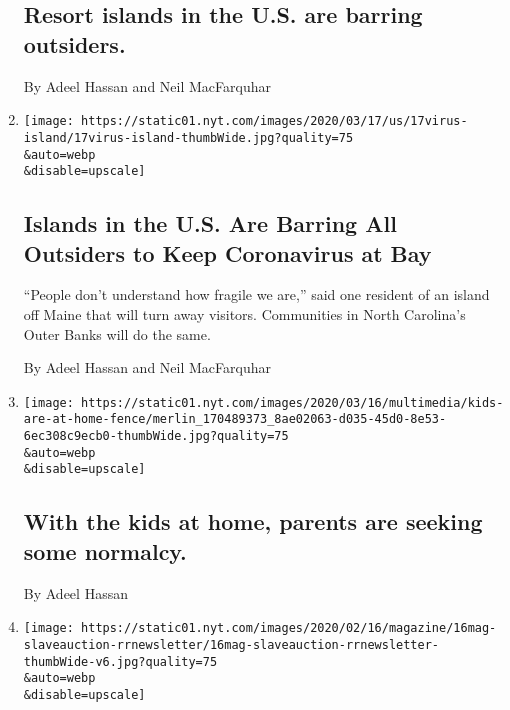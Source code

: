\begin{enumerate}
  \hypertarget{resort-islands-in-the-us-are-barring-outsiders}{%
  \subsection{Resort islands in the U.S. are barring
  outsiders.}\label{resort-islands-in-the-us-are-barring-outsiders}}

  By Adeel Hassan and Neil MacFarquhar
\item
  \href{/2020/03/17/us/north-carolina-and-maine-coronavirus.html}{}

  \texttt{[image: https://static01.nyt.com/images/2020/03/17/us/17virus-island/17virus-island-thumbWide.jpg?quality=75\\\&auto=webp\\\&disable=upscale]}

  \hypertarget{islands-in-the-us-are-barring-all-outsiders-to-keep-coronavirus-at-bay}{%
  \subsection{Islands in the U.S. Are Barring All Outsiders to Keep
  Coronavirus at
  Bay}\label{islands-in-the-us-are-barring-all-outsiders-to-keep-coronavirus-at-bay}}

  ``People don't understand how fragile we are,'' said one resident of
  an island off Maine that will turn away visitors. Communities in North
  Carolina's Outer Banks will do the same.

  By Adeel Hassan and Neil MacFarquhar
\item
  \href{/live/2020/coronavirus-usa-03-16/with-the-kids-at-home-parents-are-seeking-some-normalcy}{}

  \texttt{[image: https://static01.nyt.com/images/2020/03/16/multimedia/kids-are-at-home-fence/merlin\_170489373\_8ae02063-d035-45d0-8e53-6ec308c9ecb0-thumbWide.jpg?quality=75\\\&auto=webp\\\&disable=upscale]}

  \hypertarget{with-the-kids-at-home-parents-are-seeking-some-normalcy}{%
  \subsection{With the kids at home, parents are seeking some
  normalcy.}\label{with-the-kids-at-home-parents-are-seeking-some-normalcy}}

  By Adeel Hassan
\item
  \href{/2020/02/29/us/the-hidden-history-of-slavery-that-surrounds-us.html}{}

  \texttt{[image: https://static01.nyt.com/images/2020/02/16/magazine/16mag-slaveauction-rrnewsletter/16mag-slaveauction-rrnewsletter-thumbWide-v6.jpg?quality=75\\\&auto=webp\\\&disable=upscale]}


\end{enumerate}
